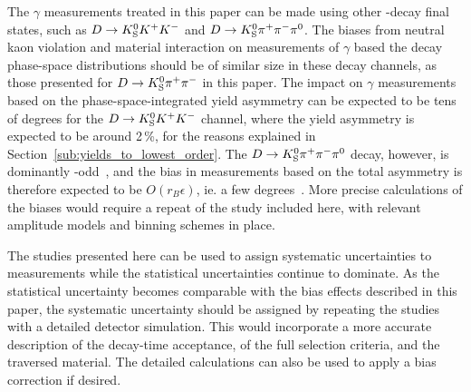 The $\gamma$ measurements treated in this paper can be made using other \D-decay final states, such as ${{D}\rightarrow{\ensuremath{{K}^0_{\mathrm{S}}}}{\ensuremath{{K}^+}}{\ensuremath{{K}^-}}}$ and ${D}\rightarrow{\ensuremath{{K}^0_{\mathrm{S}}}}{\ensuremath{{\pi}^+}}{\ensuremath{{\pi}^-}}{\ensuremath{{\pi}^0}}$. The biases from neutral kaon \CP violation and material interaction on measurements of $\gamma$ based the \D decay phase-space distributions should be of similar size in these decay channels, as those presented for ${D}\rightarrow{\ensuremath{{K}^0_{\mathrm{S}}}}{\ensuremath{{\pi}^+}}{\ensuremath{{\pi}^-}}$ in this paper. The impact on $\gamma$ measurements based on the phase-space-integrated yield asymmetry can be expected to be tens of degrees for the ${D}\rightarrow{\ensuremath{{K}^0_{\mathrm{S}}}}{\ensuremath{{K}^+}}{\ensuremath{{K}^-}}$ channel, where the yield asymmetry is expected to be around 2\,\%, for the reasons explained in Section~\ref{sub:yields_to_lowest_order}. The ${D}\rightarrow{\ensuremath{{K}^0_{\mathrm{S}}}}{\ensuremath{{\pi}^+}}{\ensuremath{{\pi}^-}}{\ensuremath{{\pi}^0}}$ decay, however, is dominantly \CP-odd~\cite{CLEOKSpipipi0}, and the bias in measurements based on the total asymmetry is therefore expected to be $O(r_B\epsilon)$, ie. a few degrees~\cite{YuvalKsCPV}. More precise calculations of the biases would require a repeat of the study included here, with relevant amplitude models and binning schemes in place.

The studies presented here can be used to assign systematic uncertainties to measurements while the statistical uncertainties continue to dominate. As the statistical uncertainty becomes comparable with the bias effects described in this paper, the systematic uncertainty should be assigned by repeating the studies with a detailed detector simulation. This would incorporate a more accurate description of the \KS decay-time acceptance, of the full selection criteria, and the traversed material. The detailed calculations can also be used to apply a bias correction if desired.






